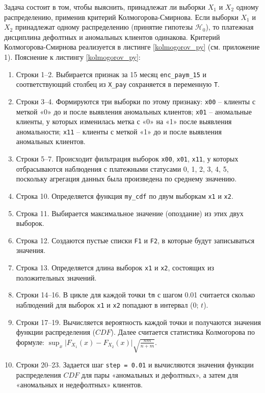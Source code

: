 Задача состоит в том, чтобы выяснить, принадлежат ли выборки $X_1$ и $X_2$ одному распределению, применив критерий Колмогорова-Смирнова. Если выборки $X_1$ и $X_2$ принадлежат одному распределению (принятие гипотезы $\mathcal{H}_0$), то платежная дисциплина дефолтных и аномальных клиентов одинакова. Критерий Колмогорова-Смирнова реализуется в листинге \ref{kolmogorov_py} (см. приложение 1). 
{\co Пояснение к листингу \ref{kolmogorov_py}:} 
\begin{enumerate}[nosep]
	\item Строки 1--2. Выбирается признак за 15 месяц \texttt{enc\_paym\_15} и соответствующий столбец из \texttt{X\_pay} сохраняется в переменную \texttt{T}. 
	\item Строки 3--4. Формируются три выборки по этому признаку: \texttt{x00} -- клиенты с меткой «0» до и после выявления аномальных клиентов; \texttt{x01} -- аномальные клиенты, у которых изменилась метка с «0» на «1» после выявления аномальности; \texttt{x11} -- клиенты с меткой «1» до и после выявления аномальных клиентов.
	\item Строки 5--7. Происходит фильтрация выборок \texttt{x00}, \texttt{x01}, \texttt{x11}, у которых отбрасываются наблюдения с платежными статусами 0, 1, 2, 3, 4, 5, поскольку агрегация данных была произведена по среднему значению.
	\item Строка 10. Определяется функция \texttt{my\_cdf} по двум выборкам \texttt{x1} и \texttt{x2}.
	\item Строка 11. Выбирается максимальное значение (опоздание) из этих двух выборок.
	\item Строка 12. Создаются пустые списки \texttt{F1} и \texttt{F2}, в которые будут записываться значения. 
	\item Строка 13. Определяется длина выборок \texttt{x1} и \texttt{x2}, состоящих из положительных значений.
	\item Строки 14--16. В цикле для каждой точки \texttt{tm} с шагом 0.01 считается сколько наблюдений для выборок \texttt{x1} и \texttt{x2} попадают в интервал (0; $t$). 
	\item Строки 17--19. Вычисляется вероятность каждой точки и получаются значения функции распределения ($CDF$). Далее считается статистика Колмогорова по формуле: $ \sup_x \bigl| F_{X_1}(x) - F_{X_2}(x) \bigr| \sqrt{\frac{nm}{n+m}}$.
	\item Строки 20--23. Задается шаг \texttt{step = 0.01} и вычисляются значения функции распределения $CDF$ для пары «аномальных и дефолтных», а затем для «аномальных и недефолтных» клиентов.
\end{enumerate}

